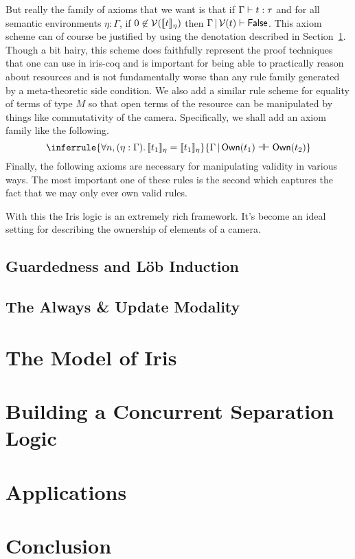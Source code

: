 \documentclass{amsart}
\newcommand{\provesJ}[3]{#1 \mathop{\vert} #2 \proves #3}
\newcommand{\provesIffJ}[3]{#1 \mathop{\vert} #2 \provesIff #3}
\begin{document}
But really the family of axioms that we want is that if
$\Gamma \vdash t : \tau$ and for all semantic environments
$\eta : \Gamma$, if $0 \not\in \mathcal{V}(\llbracket t \rrbracket_\eta)$ then
$\provesJ{\Gamma}{\mval(t)}{\FALSE}$. This axiom scheme can of course
be justified by using the denotation described in
Section~\ref{sec:model}. Though a bit hairy, this scheme does
faithfully represent the proof techniques that one can use in iris-coq
and is important for being able to practically reason about resources
and is not fundamentally worse than any rule family generated by a
meta-theoretic side condition. We also add a similar rule scheme for
equality of terms of type $M$ so that open terms of the resource can
be manipulated by things like commutativity of the
camera. Specifically, we shall add an axiom family like the
following.
\[
  \inferrule{
    \All n, (\eta : \Gamma). \Sem{t_1}_\eta = \Sem{t_1}_\eta
  }{\provesIffJ{\Gamma}{\ownM{t_1}}{\ownM{t_2}}}
\]
Finally, the following axioms are necessary for manipulating validity
in various ways. The most important one of these rules is the second
which captures the fact that we may only ever own valid rules.
With this the Iris logic is an extremely rich framework. It's become
an ideal setting for describing the ownership of elements of a
camera.

\subsection{Guardedness and L\"{o}b Induction}\label{subsec:guarded}

\subsection{The Always \& Update Modality}\label{subsec:always}

\section{The Model of Iris}\label{sec:model}

\section{Building a Concurrent Separation Logic}\label{sec:encoding}

\section{Applications}\label{sec:applications}

\section{Conclusion}\label{sec:conclusions}



{}
\end{document}
